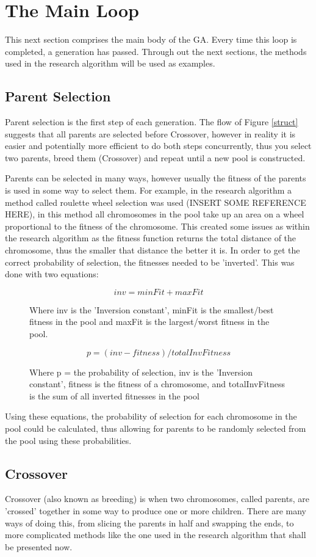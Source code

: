 \section{The Main Loop}
\par
This next section comprises the main body of the GA. Every time this loop is completed, a generation has passed. Through out the next sections, the methods used in the research algorithm will be used as examples.
\subsection{Parent Selection}
\par
Parent selection is the first step of each generation. The flow of Figure \ref{struct} suggests that all parents are selected before Crossover, however in reality it is easier and potentially more efficient to do both steps concurrently, thus you select two parents, breed them (Crossover) and repeat until a new pool is constructed.
\par
Parents can be selected in many ways, however usually the fitness of the parents is used in some way to select them. For example, in the research algorithm a method called roulette wheel selection was used (INSERT SOME REFERENCE HERE), in this method all chromosomes in the pool take up an area on a wheel proportional to the fitness of the chromosome. This created some issues as within the research algorithm as the fitness function returns the total distance of the chromosome, thus the smaller that distance the better it is. In order to get the correct probability of selection, the fitnesses needed to be 'inverted'. This was done with two equations: 
\begin{figure}
\[ inv = minFit + maxFit\]
\caption{Where inv is the 'Inversion constant', minFit is the smallest/best fitness in the pool and maxFit is the largest/worst fitness in the pool.}
\end{figure}
\begin{figure}
\[ p = (inv - fitness)/totalInvFitness\]
\caption{Where p = the probability of selection, inv is the 'Inversion constant', fitness is the fitness of a chromosome, and totalInvFitness is the sum of all inverted fitnesses in the pool}
\end{figure}
Using these equations, the probability of selection for each chromosome in the pool could be calculated, thus allowing for parents to be randomly selected from the pool using these probabilities.
\subsection{Crossover}
\par
Crossover (also known as breeding) is when two chromosomes, called parents, are 'crossed' together in some way to produce one or more children. There are many ways of doing this, from slicing the parents in half and swapping the ends, to more complicated methods like the one used in the research algorithm that shall be presented now.

